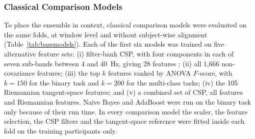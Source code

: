 \documentclass[pdflatex,sn-mathphys-num]{sn-jnl}%
\theoremstyle{thmstyleone}%
\theoremstyle{thmstyletwo}%
\theoremstyle{thmstylethree}%
\begin{document}
\subsubsection{Classical Comparison Models}\label{subsec:baselinemodels}

To place the ensemble in context, classical comparison models were evaluated on the same folds, at window level and without subject-wise alignment (Table~\ref{tab:basemodels}). Each of the first six models was trained on five alternative feature sets: (i) filter-bank CSP, with four components in each of seven sub-bands between 4 and 40~Hz, giving 28 features \citep{Ang2012}; (ii) all 1,666 non-covariance features; (iii) the top $k$ features ranked by ANOVA $F$-score, with $k = 150$ for the binary task and $k = 200$ for the multi-class tasks; (iv) the 105 Riemannian tangent-space features; and (v) a combined set of CSP, all features and Riemannian features. Naive Bayes and AdaBoost were run on the binary task only because of their run time. In every comparison model the scaler, the feature selection, the CSP filters and the tangent-space reference were fitted inside each fold on the training participants only.
\end{document}

